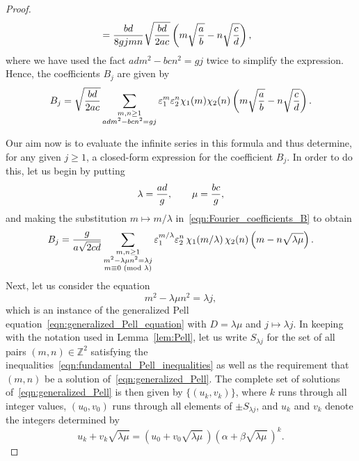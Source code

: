 \documentclass[11pt,reqno]{amsart}
\renewcommand{\=}{\;=\;}
\theoremstyle{myremark}
\begin{document}
\begin{proof}
\begin{align*}
&= {bd \over 8gjmn} \sqrt{bd \over 2ac} \left(m\sqrt{a \over b}-n\sqrt{c \over d} \right),
\end{align*}
where we have used the fact $adm^2-bcn^2 = gj$ twice to simplify the expression.
Hence, the coefficients $B_j$ are given by
\begin{equation} \label{eqn:Fourier_coefficients_B}
B_j = \sqrt{bd \over 2ac} \sum_{\substack{m,n \geq 1 \\ adm^2-bcn^2 = gj}} \varepsilon_1^m \varepsilon_2^n \chi_1(m) \chi_2(n) \left(m\sqrt{a \over b}-n\sqrt{c \over d} \right).
\end{equation}

Our aim now is to evaluate the infinite series in this formula and thus determine, for any given $j \geq 1$, a closed-form expression for the coefficient $B_j$. 
In order to do this, let us begin by putting
\[ 
\lambda = {ad \over g}, \qquad \mu = {bc \over g},
\]
and making the substitution $m \mapsto m/\lambda$ in~\eqref{eqn:Fourier_coefficients_B} to obtain
\begin{equation} \label{eqn:Fourier_coefficients_B_ver_2}
B_j = {g \over a\sqrt{2cd}} \sum_{\substack{m,n \geq 1 \\ m^2-\lambda\mu n^2 = \lambda j \\ m \equiv 0 \text{ (mod $\lambda$)}}} \varepsilon_1^{m/\lambda} \varepsilon_2^n\, \chi_1(m/\lambda)\, \chi_2(n) \left(m-n\sqrt{\lambda\mu} \right).
\end{equation}
Next, let us consider the equation
\begin{equation} \label{eqn:generalized_Pell}
m^2-\lambda\mu n^2 = \lambda j,
\end{equation}
which is an instance of the generalized Pell equation~\eqref{eqn:generalized_Pell_equation} with $D=\lambda\mu$ and $j \mapsto \lambda j$. 
In keeping with the notation used in Lemma~\ref{lem:Pell}, let us write $S_{\lambda j}$ for the set of all pairs $(m,n) \in \mathbb{Z}^2$ satisfying the inequalities~\eqref{eqn:fundamental_Pell_inequalities} as well as the requirement that $(m,n)$ be a solution of~\eqref{eqn:generalized_Pell}. 
The complete set of solutions of~\eqref{eqn:generalized_Pell} is then given by $\{(u_k,v_k)\}$, where $k$ runs through all integer values, $(u_0,v_0)$ runs through all elements of $\pm S_{\lambda j}$, and $u_k$ and $v_k$ denote the integers determined by
\begin{equation} \label{eqn:Pell_equivalence_class_generation}
u_k + v_k \sqrt{\lambda\mu} = (u_0 + v_0 \sqrt{\lambda\mu} \,) (\alpha + \beta \sqrt{\lambda\mu} \,)^k.

\end{equation}
\end{proof}
\end{document}
